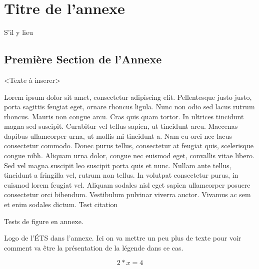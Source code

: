 \documentclass[letterpaper, twoside, 12pt,these,creativecommons,hyperref]{thETS}
\begin{document}
\multiannexe %
%
\chapter{Titre de l'annexe} 

S'il y lieu

\section{Première Section de l'Annexe}
<Texte à inserer> 

Lorem ipsum dolor sit amet, consectetur adipiscing elit. Pellentesque justo justo, porta sagittis feugiat eget, ornare rhoncus ligula. Nunc non odio sed lacus rutrum rhoncus. Mauris non congue arcu. Cras quis quam tortor. In ultrices tincidunt magna sed suscipit. Curabitur vel tellus sapien, ut tincidunt arcu. Maecenas dapibus ullamcorper urna, ut mollis mi tincidunt a. Nam eu orci nec lacus consectetur commodo. Donec purus tellus, consectetur at feugiat quis, scelerisque congue nibh. Aliquam urna dolor, congue nec euismod eget, convallis vitae libero. Sed vel magna suscipit leo suscipit porta quis et nunc. Nullam ante tellus, tincidunt a fringilla vel, rutrum non tellus. In volutpat consectetur purus, in euismod lorem feugiat vel. Aliquam sodales nisl eget sapien ullamcorper posuere consectetur orci bibendum. Vestibulum pulvinar viverra auctor. Vivamus ac sem et enim sodales dictum. Test citation \cite{Bha10}

Tests de figure en annexe.

%

\begin{figureap}[ht]
	\caption{Logo de l'ÉTS dans l'annexe. Ici on va mettre un peu plus de texte pour voir comment va être la présentation de
	la légende dans ce cas.}
	\label{fig:testap}
\end{figureap}
\begin{center}
\begin{equation} 
2*x=4 
\end{equation}
\end{center}
\end{document}
